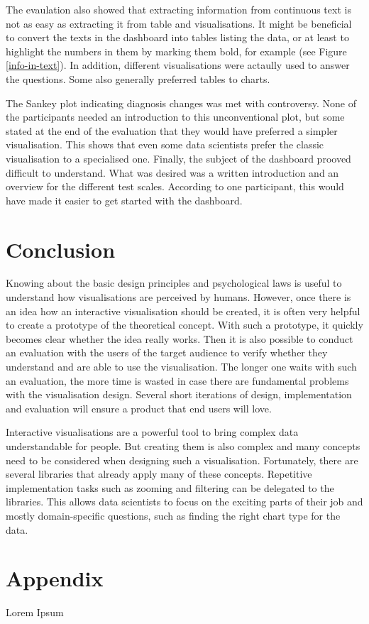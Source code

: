 \documentclass[11pt]{article}
\begin{document}
The evaulation also showed that extracting information from continuous text is not as easy as extracting it from table and visualisations. It might be beneficial to convert the texts in the dashboard into tables listing the data, or at least to highlight the numbers in them by marking them bold, for example (see Figure \ref{info-in-text}). In addition, different visualisations were actaully used to answer the questions. Some also generally preferred tables to charts.

The Sankey plot indicating diagnosis changes was met with controversy. None of the participants needed an introduction to this unconventional plot, but some stated at the end of the evaluation that they would have preferred a simpler visualisation. This shows that even some data scientists prefer the classic visualisation to a specialised one. Finally, the subject of the dashboard prooved difficult to understand. What was desired was a written introduction and an overview for the different test scales. According to one participant, this would have made it easier to get started with the dashboard.

\section{Conclusion}

Knowing about the basic design principles and psychological laws is useful to understand how visualisations are perceived by humans. However, once there is an idea how an interactive visualisation should be created, it is often very helpful to create a prototype of the theoretical concept. With such a prototype, it quickly becomes clear whether the idea really works. Then it is also possible to conduct an evaluation with the users of the target audience to verify whether they understand and are able to use the visualisation. The longer one waits with such an evaluation, the more time is wasted in case there are fundamental problems with the visualisation design. Several short iterations of design, implementation and evaluation will ensure a product that end users will love.

Interactive visualisations are a powerful tool to bring complex data understandable for people. But creating them is also complex and many concepts need to be considered when designing such a visualisation. Fortunately, there are several libraries that already apply many of these concepts. Repetitive implementation tasks such as zooming and filtering can be delegated to the libraries. This allows data scientists to focus on the exciting parts of their job and mostly domain-specific questions, such as finding the right chart type for the data.

\pagebreak
\section{Appendix}
Lorem Ipsum

\pagebreak
\printbibliography
\end{document}
